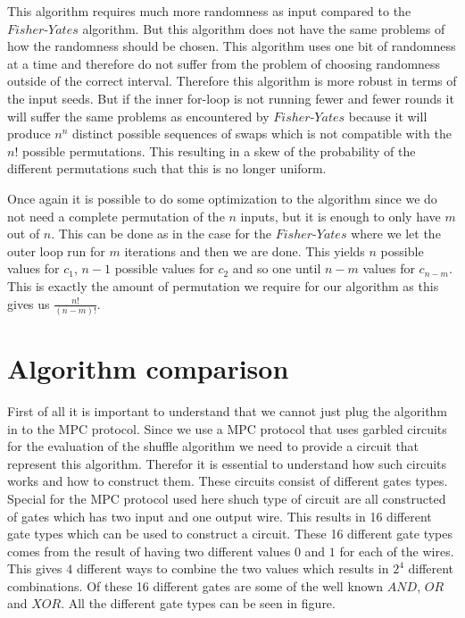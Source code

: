 This algorithm requires much more randomness as input compared to the $Fisher\text{-}Yates$ algorithm. But this algorithm does not have the same problems of how the randomness should be chosen. This algorithm uses one bit of randomness at a time and therefore do not suffer from the problem of choosing randomness outside of the correct interval. Therefore this algorithm is more robust in terms of the input seeds. But if the inner for-loop is not running fewer and fewer rounds it will suffer the same problems as encountered by $Fisher\text{-}Yates$ because it will produce $n^n$ distinct possible sequences of swaps which is not compatible with the $n!$ possible permutations. This resulting in a skew of the probability of the different permutations such that this is no longer uniform.

\bigskip
Once again it is possible to do some optimization to the algorithm since we do not need a complete permutation of the $n$ inputs, but it is enough to only have $m$ out of $n$. This can be done as in the case for the $Fisher\text{-}Yates$ where we let the outer loop run for $m$ iterations and then we are done. This yields $n$ possible values for $c_1$, $n-1$ possible values for $c_2$ and so one until $n-m$ values for $c_{n-m}$. This is exactly the amount of permutation we require for our algorithm as this gives us $\frac{n!}{(n-m)!}$.



\section{Algorithm comparison}
First of all it is important to understand that we cannot just plug the algorithm in to the MPC protocol. Since we use a MPC protocol that uses garbled circuits for the evaluation of the shuffle algorithm we need to provide a circuit that represent this algorithm. Therefor it is essential to understand how such circuits works and how to construct them. These circuits consist of different gates types. Special for the MPC protocol used here shuch type of circuit are all constructed of gates which has two input and one output wire. This results in 16 different gate types which can be used to construct a circuit. These 16 different gate types comes from the result of having two different values $0$ and $1$ for each of the wires. This gives $4$ different ways to combine the two values which results in $2^4$ different combinations. Of these 16 different gates are some of the well known $AND$, $OR$ and $XOR$. All the different gate types can be seen in figure.

